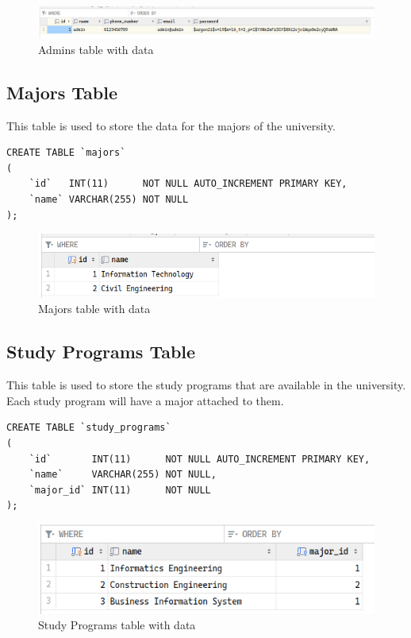 \documentclass[12pt,titlepage]{article}
\begin{document}
\begin{figure}[h]
    \centering
    \includegraphics[width=\textwidth]{./images/admins-table.png}
    \caption{Admins table with data}
\end{figure}

\subsection{Majors Table}
This table is used to store the data for the majors of the university.

\begin{verbatim}
CREATE TABLE `majors`
(
    `id`   INT(11)      NOT NULL AUTO_INCREMENT PRIMARY KEY,
    `name` VARCHAR(255) NOT NULL
);
\end{verbatim}

\begin{figure}[h]
    \centering
    \includegraphics[width=.6\textwidth]{./images/majors-table.png}
    \caption{Majors table with data}
\end{figure}

\subsection{Study Programs Table}
This table is used to store the study programs that are available in the university.
Each study program will have a major attached to them.

\begin{verbatim}
CREATE TABLE `study_programs`
(
    `id`       INT(11)      NOT NULL AUTO_INCREMENT PRIMARY KEY,
    `name`     VARCHAR(255) NOT NULL,
    `major_id` INT(11)      NOT NULL
);
\end{verbatim}

\begin{figure}[h]
    \centering
    \includegraphics[width=.6\textwidth]{./images/study-programs-table.png}
    \caption{Study Programs table with data}
\end{figure}
\end{document}
